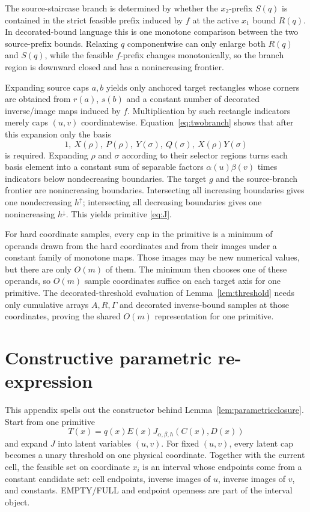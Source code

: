 \documentclass[12pt,a4paper]{article}
\theoremstyle{definition}
\newcommand{\1}{\mathbf 1}
\begin{document}
The source-staircase branch is determined by whether the $x_2$-prefix $S(q)$ is contained in the strict feasible prefix induced by $f$ at the active $x_1$ bound $R(q)$.  In decorated-bound language this is one monotone comparison between the two source-prefix bounds.  Relaxing $q$ componentwise can only enlarge both $R(q)$ and $S(q)$, while the feasible $f$-prefix changes monotonically, so the branch region is downward closed and has a nonincreasing frontier.

Expanding source caps $a,b$ yields only anchored target rectangles whose corners are obtained from $r(a)$, $s(b)$ and a constant number of decorated inverse/image maps induced by $f$.  Multiplication by such rectangle indicators merely caps $(u,v)$ coordinatewise. Equation~\eqref{eq:twobranch} shows that after this expansion only the basis
\[
1,\ X(\rho),\ P(\rho),\ Y(\sigma),\ Q(\sigma),\ X(\rho)Y(\sigma)
\]
is required. Expanding $\rho$ and $\sigma$ according to their selector regions turns each basis element into a constant sum of separable factors $\alpha(u)\beta(v)$ times indicators below nondecreasing boundaries. The target $g$ and the source-branch frontier are nonincreasing boundaries. Intersecting all increasing boundaries gives one nondecreasing $h^\uparrow$; intersecting all decreasing boundaries gives one nonincreasing $h^\downarrow$. This yields primitive \eqref{eq:J}.

For hard coordinate samples, every cap in the primitive is a minimum of operands drawn from the hard coordinates and from their images under a constant family of monotone maps.  Those images may be new numerical values, but there are only $O(m)$ of them.  The minimum then chooses one of these operands, so $O(m)$ sample coordinates suffice on each target axis for one primitive. The decorated-threshold evaluation of Lemma~\ref{lem:threshold} needs only cumulative arrays $A,R,\Gamma$ and decorated inverse-bound samples at those coordinates, proving the shared $O(m)$ representation for one primitive.

\section{Constructive parametric re-expression}              \label{app:closure}

This appendix spells out the constructor behind Lemma~\ref{lem:parametricclosure}.  Start from one primitive
\[
T(x)=q(x)E(x)J_{\alpha,\beta,h}(C(x),D(x))
\]
and expand $J$ into latent variables $(u,v)$.  For fixed $(u,v)$, every latent cap becomes a unary threshold on one physical coordinate.  Together with the current cell, the feasible set on coordinate $x_i$ is an interval whose endpoints come from a constant candidate set: cell endpoints, inverse images of $u$, inverse images of $v$, and constants.  EMPTY/FULL and endpoint openness are part of the interval object.
\end{document}
